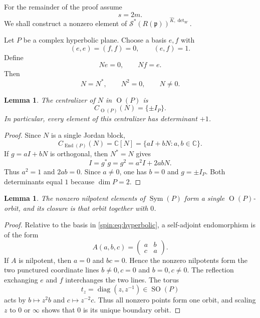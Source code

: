 \documentclass[11pt,reqno]{amsart}
\numberwithin{equation}{section}
\newtheorem{lemma}[theorem]{Lemma}
\theoremstyle{definition}
\theoremstyle{remark}
\newcommand{\C}{\mathbb C}
\newcommand{\SO}{\operatorname{SO}}
\newcommand{\Or}{\operatorname{O}}
\newcommand{\Sym}{\operatorname{Sym}}
\newcommand{\End}{\operatorname{End}}
\newcommand{\diag}{\operatorname{diag}}
\newcommand{\fp}{\mathfrak p}
\newcommand{\cS}{\mathcal S}
\begin{document}
For the remainder of the proof assume
\begin{equation}\label{spin:eq:s-even}
  s=2m.
\end{equation}
We shall construct a nonzero element of
$\cS^*(R(\fp))^{\widehat K,\det_W}$.

Let $P$ be a complex hyperbolic plane.  Choose a basis $e,f$ with
\begin{equation}\label{spin:eq:hyperbolic}
  (e,e)=(f,f)=0,
  \qquad
  (e,f)=1.
\end{equation}
Define
\begin{equation}\label{spin:eq:Nranktwo}
  Ne=0,
  \qquad
  Nf=e.
\end{equation}
Then
\[
  N=N^*,
  \qquad
  N^2=0,
  \qquad
  N\ne0.
\]

\begin{lemma}\label{spin:lem:ranktwo-centralizer}
The centralizer of $N$ in $\Or(P)$ is
\[
  C_{\Or(P)}(N)=\{\pm I_P\}.
\]
In particular, every element of this centralizer has determinant $+1$.
\end{lemma}

\begin{proof}
Since $N$ is a single Jordan block,
\[
  C_{\End(P)}(N)=\C[N]=\{aI+bN:a,b\in\C\}.
\]
If $g=aI+bN$ is orthogonal, then $N^*=N$ gives
\[
  I=g^*g=g^2=a^2I+2abN.
\]
Thus $a^2=1$ and $2ab=0$.  Since $a\ne0$, one has $b=0$ and
$g=\pm I_P$.  Both determinants equal $1$ because $\dim P=2$.
\end{proof}

\begin{lemma}\label{spin:lem:ranktwo-orbit}
The nonzero nilpotent elements of $\Sym(P)$ form a single $\Or(P)$-orbit, and
its closure is that orbit together with $0$.
\end{lemma}

\begin{proof}
Relative to the basis in \eqref{spin:eq:hyperbolic}, a self-adjoint endomorphism is
of the form
\[
  A(a,b,c)=
  \begin{pmatrix}
    a&b\\ c&a
  \end{pmatrix}.
\]
If $A$ is nilpotent, then $a=0$ and $bc=0$.  Hence the nonzero nilpotents form
the two punctured coordinate lines $b\ne0,c=0$ and $b=0,c\ne0$.  The
reflection exchanging $e$ and $f$ interchanges the two lines.  The torus
\[
  t_z=\diag(z,z^{-1})\in\SO(P)
\]
acts by $b\mapsto z^2b$ and $c\mapsto z^{-2}c$.  Thus all nonzero points form
one orbit, and scaling $z$ to $0$ or $\infty$ shows that $0$ is its unique
boundary orbit.
\end{proof}
\end{document}
